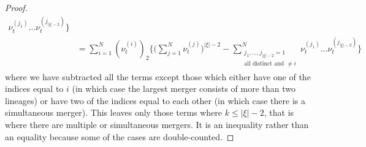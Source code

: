 \begin{proof}
\begin{align*}
        \nu_t^{ ( j_1 ) } \ldots \nu_t^{ ( j_{ | \xi | - 2 } ) } \Bigg\} \\
&= \sum_{ i = 1 }^N ( \nu_t^{ ( i ) } )_2 
        \Bigg\{ \Bigg( \sum_{j=1}^N \nu_t^{(j)} \Bigg)^{|\xi|-2}
        - \sum_{ \substack{ j_1, \ldots, j_{ | \xi | - 2 } = 1 
        \\ \text{all distinct and } \neq i } }^N 
        \nu_t^{ ( j_1 ) } \ldots \nu_t^{ ( j_{ | \xi | - 2 } ) } \Bigg\} 
\end{align*}
where we have subtracted all the terms except those which either have one of the indices equal to $i$ (in which case the largest merger consists of more than two lineages) or have two of the indices equal to each other (in which case there is a simultaneous merger).
This leaves only those terms where $k\leq |\xi|-2$, that is where there are multiple or simultaneous mergers. It is an inequality rather than an equality because some of the cases are double-counted.


\end{proof}
